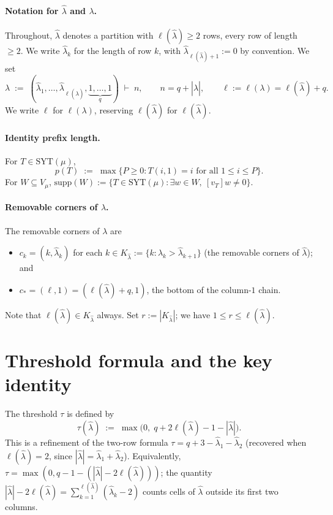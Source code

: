 \documentclass[11pt]{article}
\theoremstyle{definition}
\newcommand{\hatl}{\widehat\lambda}
\newcommand{\supp}{\mathrm{supp}}
\newcommand{\SYT}{\mathrm{SYT}}
\newcommand{\elh}{\ell(\hatl)}
\begin{document}
\paragraph{Notation for $\hatl$ and $\lambda$.}  Throughout, $\hatl$
denotes a partition with $\elh \ge 2$ rows, every row of length $\ge 2$.
We write $\hatl_k$ for the length of row $k$, with $\hatl_{\elh+1} := 0$
by convention.  We set
\[
   \lambda \;:=\; (\hatl_1, \ldots, \hatl_{\elh}, \underbrace{1, \ldots, 1}_{q})
   \;\vdash\; n,
   \qquad n = q + |\hatl|,
   \qquad \ell := \ell(\lambda) = \elh + q.
\]
We write $\ell$ for $\ell(\lambda)$, reserving $\elh$ for $\ell(\hatl)$.

\paragraph{Identity prefix length.}
For $T \in \SYT(\mu)$,
\[
   p(T) \;:=\; \max\{P \ge 0 : T(i, 1) = i \text{ for all } 1 \le i \le P\}.
\]
For $W \subseteq V_\mu$,
$\supp(W) := \{T \in \SYT(\mu) : \exists w \in W,\ [v_T] w \ne 0\}$.

\paragraph{Removable corners of $\lambda$.}
The removable corners of $\lambda$ are
\begin{itemize}[topsep=0.2em,itemsep=0.1em]
\item $c_k = (k, \hatl_k)$ for each $k \in K_{\hatl} := \{k : \hatl_k > \hatl_{k+1}\}$
   (the removable corners of $\hatl$); and
\item $c_* = (\ell, 1) = (\elh+q, 1)$, the bottom of the column-$1$ chain.
\end{itemize}
Note that $\elh \in K_{\hatl}$ always.  Set $r := |K_{\hatl}|$; we have
$1 \le r \le \elh$.

\section{Threshold formula and the key identity}\label{sec:threshold}

The threshold $\tau$ is defined by
\begin{equation}\label{eq:tau-def}
   \tau(\hatl) \;:=\; \max\bigl(0,\; q + 2\elh - 1 - |\hatl|\bigr).
\end{equation}
This is a refinement of the two-row formula $\tau = q + 3 - \hatl_1
- \hatl_2$ (recovered when $\elh = 2$, since $|\hatl| = \hatl_1 +
\hatl_2$).  Equivalently, $\tau = \max(0, q - 1 - (|\hatl| - 2\elh))$;
the quantity $|\hatl| - 2\elh = \sum_{k=1}^{\elh} (\hatl_k - 2)$
counts cells of $\hatl$ outside its first two columns.
\end{document}
